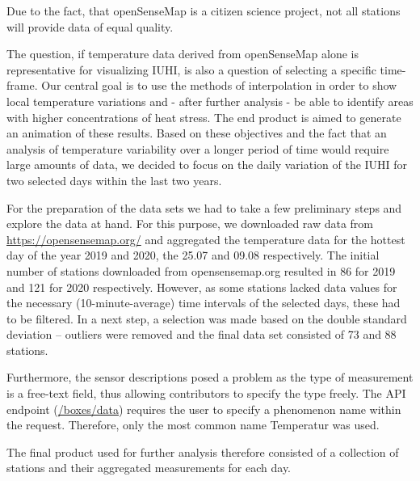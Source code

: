 Due to the fact, that openSenseMap is a citizen science project, not all stations will provide data of equal quality.

The question, if temperature data derived from openSenseMap alone is representative for visualizing IUHI, is also a question of selecting a specific time-frame. Our central goal is to use the methods of interpolation in order to show local temperature variations and - after further analysis - be able to identify areas with higher concentrations of heat stress. The end product is aimed to generate an animation of these results. Based on these objectives and the fact that an analysis of temperature variability over a longer period of time would require large amounts of data, we decided to focus on the daily variation of the IUHI for two selected days within the last two years.

For the preparation of the data sets we had to take a few preliminary steps and explore the data at hand. For this purpose, we downloaded raw data from \url{https://opensensemap.org/} and aggregated the temperature data for the hottest day of the year 2019 and 2020, the 25.07 and 09.08 respectively. The initial number of stations downloaded from opensensemap.org resulted in 86 for 2019 and 121 for 2020 respectively. However, as some stations lacked data values for the necessary (10-minute-average) time intervals of the selected days, these had to be filtered. In a next step, a selection was made based on the double standard deviation – outliers were removed and the final data set consisted of 73 and 88 stations.

Furthermore, the sensor descriptions posed a problem as the type of measurement is a free-text field, thus allowing contributors to specify the type freely. The API endpoint (\url{/boxes/data}) requires the user to specify a phenomenon name within the request. Therefore, only the most common name \ldq{}Temperatur\rdq{} was used.

The final product used for further analysis therefore consisted of a collection of stations and their aggregated measurements for each day.






